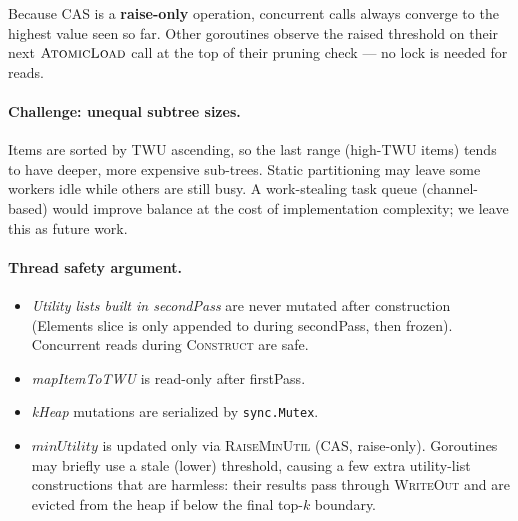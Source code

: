 Because CAS is a \textbf{raise-only} operation, concurrent calls always converge to
the highest value seen so far.
Other goroutines observe the raised threshold on their next $\textsc{AtomicLoad}$ call
at the top of their pruning check --- no lock is needed for reads.

\paragraph{Challenge: unequal subtree sizes.}
Items are sorted by TWU ascending, so the last range (high-TWU items) tends to have
deeper, more expensive sub-trees.
Static partitioning may leave some workers idle while others are still busy.
A work-stealing task queue (channel-based) would improve balance at the cost of
implementation complexity; we leave this as future work.

\paragraph{Thread safety argument.}
\begin{itemize}
  \item \emph{Utility lists built in secondPass} are never mutated after construction
        (Elements slice is only appended to during secondPass, then frozen).
        Concurrent reads during \textsc{Construct} are safe.
  \item \emph{mapItemToTWU} is read-only after firstPass.
  \item \emph{kHeap} mutations are serialized by \texttt{sync.Mutex}.
  \item \emph{$minUtility$} is updated only via \textsc{RaiseMinUtil} (CAS, raise-only).
        Goroutines may briefly use a stale (lower) threshold, causing a few extra
        utility-list constructions that are harmless: their results pass through
        \textsc{WriteOut} and are evicted from the heap if below the final top-$k$ boundary.
\end{itemize}
